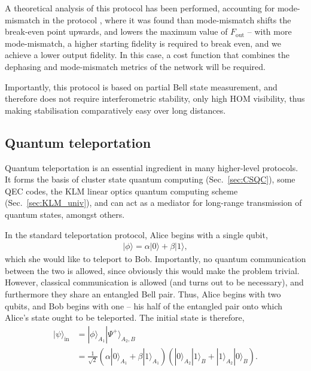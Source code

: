 \documentclass[aps,rmp,twocolumn,amsmath,amssymb,nofootinbib,superscriptaddress]{revtex4}
\newcommand{\ket}[1]{|#1\rangle}
\begin{document}
A theoretical analysis of this protocol has been performed, accounting for mode-mismatch in the protocol \cite{bib:RohdeOptEntPur06}, where it was found than mode-mismatch shifts the break-even point upwards, and lowers the maximum value of $F_\mathrm{out}$ -- with more mode-mismatch, a higher starting fidelity is required to break even, and we achieve a lower output fidelity. In this case, a cost function that combines the dephasing and mode-mismatch metrics of the network will be required.

Importantly, this protocol is based on partial Bell state measurement, and therefore does not require interferometric stability, only high HOM visibility, thus making stabilisation comparatively easy over long distances.

%
%

\subsection{Quantum teleportation} \label{sec:teleport}

Quantum teleportation \cite{???} is an essential ingredient in many higher-level protocols. It forms the basis of cluster state quantum computing (Sec.~\ref{sec:CSQC}), some QEC codes, the KLM linear optics quantum computing scheme (Sec.~\ref{sec:KLM_univ}), and can act as a mediator for long-range transmission of quantum states, amongst others.

In the standard teleportation protocol, Alice begins with a single qubit,
\begin{align}
\ket\phi = \alpha\ket{0} +\beta\ket{1},
\end{align}
which she would like to teleport to Bob. Importantly, no quantum communication between the two is allowed, since obviously this would make the problem trivial. However, classical communication is allowed (and turns out to be necessary), and furthermore they share an entangled Bell pair. Thus, Alice begins with two qubits, and Bob begins with one -- his half of the entangled pair onto which Alice's state ought to be teleported. The initial state is therefore,
\begin{align}
\ket\psi_\mathrm{in} &= \ket{\phi}_{A_1} \ket{\Psi^+}_{A_2,B} \nonumber \\
&= \frac{1}{\sqrt{2}} (\alpha\ket{0}_{A_1}+\beta\ket{1}_{A_1}) (\ket{0}_{A_2}\ket{1}_B + \ket{1}_{A_2}\ket{0}_B).
\end{align}
\end{document}
